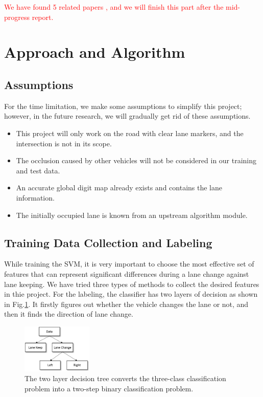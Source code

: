\documentclass[10pt,twocolumn,letterpaper]{article}
\begin{document}
\textcolor{red}{We have found 5 related papers \cite{mandalia2005using,pentland1999modeling,kuge2000driver,olsen2003modeling,salvucci2004inferring}, and we will finish this part after the mid-progress report.}

\section{Approach and Algorithm}

\subsection{Assumptions}

For the time limitation, we make some assumptions to simplify this project; however, in the future research, we will gradually get rid of these assumptions.

\begin{itemize}
	\item This project will only work on the road with clear lane markers, and the intersection is not in its scope.
	\item The occlusion caused by other vehicles will not be considered in our training and test data.
	\item An accurate global digit map already exists and contains the lane information.
	\item The initially occupied lane is known from an upstream algorithm module.
\end{itemize}

\subsection{Training Data Collection and Labeling}

While training the SVM, it is very important to choose the most effective set of features that can represent significant differences during a lane change against lane keeping. We have tried three types of methods to collect the desired features in thie project. For the labeling, the classifier has two layers of decision as shown in Fig.\ref{fig:label}. It firstly figures out whether the vehicle changes the lane or not, and then it finds the direction of lane change.

\begin{figure}[t]
	\centering
	\includegraphics[width=0.3\textwidth]{./img/label.png}
	\caption{The two layer decision tree converts the three-class classification problem into a two-step binary classification problem.}
	\label{fig:label}
\end{figure}
\end{document}
